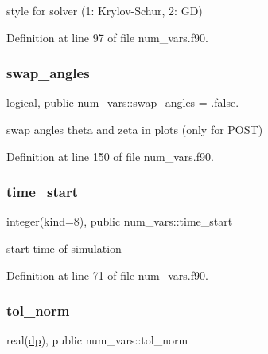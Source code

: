 style for solver (1\+: Krylov-\/\+Schur, 2\+: GD) 



Definition at line 97 of file num\+\_\+vars.\+f90.

\mbox{\label{namespacenum__vars_adaf8e128a1b232b8231305be41a55bdc}} 
\subsubsection{\texorpdfstring{swap\+\_\+angles}{swap\_angles}}
{\footnotesize\ttfamily logical, public num\+\_\+vars\+::swap\+\_\+angles = .false.}



swap angles theta and zeta in plots (only for P\+O\+ST) 



Definition at line 150 of file num\+\_\+vars.\+f90.

\mbox{\label{namespacenum__vars_a70922471370a77597325ce9ef7b897a2}} 
\subsubsection{\texorpdfstring{time\+\_\+start}{time\_start}}
{\footnotesize\ttfamily integer(kind=8), public num\+\_\+vars\+::time\+\_\+start}



start time of simulation 



Definition at line 71 of file num\+\_\+vars.\+f90.

\mbox{\label{namespacenum__vars_a301b25f19135f2bee8ccce99257ae86c}} 
\subsubsection{\texorpdfstring{tol\+\_\+norm}{tol\_norm}}
{\footnotesize\ttfamily real(\hyperlink{namespacenum__vars_a03802aa2bd86439d7a9370836fabf3f2}{dp}), public num\+\_\+vars\+::tol\+\_\+norm}



